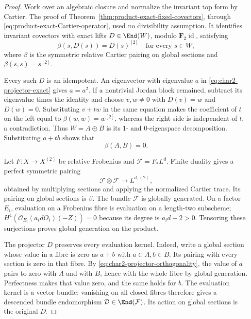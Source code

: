 \begin{proof}
Work over an algebraic closure and normalize the invariant top
form by Cartier.  The proof of
Theorem~\ref{thm:product-exact-fixed-covectors}, through
\eqref{eq:product-exact-Cartier-operator}, used no divisibility
assumption.  It identifies invariant covectors with exact lifts
$D\in\End(W)$, modulo $\mathbf F_2\operatorname{id}$, satisfying
\begin{equation}\label{eq:char2-projector-exact}
        \beta(s,D(s))=D(s)^{[2]}\quad\text{for every }s\in W,
\end{equation}
where $\beta$ is the symmetric relative Cartier pairing on
global sections and $\beta(s,s)=s^{[2]}$.

Every such $D$ is an idempotent.  An eigenvector with eigenvalue
$a$ in \eqref{eq:char2-projector-exact} gives $a=a^2$.
If a nontrivial Jordan block remained, subtract its eigenvalue
times the identity and choose $v,w\ne0$ with $D(v)=w$ and
$D(w)=0$.  Substituting $v+tw$ in the same equation makes the
coefficient of $t$ on the left equal to $\beta(w,w)=w^{[2]}$,
whereas the right side is independent of $t$, a contradiction.
Thus $W=A\oplus B$ is its $1$- and $0$-eigenspace decomposition.
Substituting $a+tb$ shows that
\begin{equation}\label{eq:char2-projector-orthogonality}
                    \beta(A,B)=0.
\end{equation}

Let $F:X\to X^{(2)}$ be relative Frobenius and
$\mathcal F=F_*L^d$.  Finite duality gives a perfect symmetric
pairing
\[
 \mathcal F\otimes\mathcal F\longrightarrow L^{d,(2)},
\]
obtained by multiplying sections and applying the normalized
Cartier trace.  Its pairing on global sections is $\beta$.
The bundle $\mathcal F$ is globally generated.  On a factor
$E_i$, evaluation on a Frobenius fibre is evaluation on a
length-two subscheme; $H^1(\mathcal O_{E_i}(a_idO_i)(-Z))=0$
because its degree is $a_i d-2>0$.  Tensoring these surjections
proves global generation on the product.

The projector $D$ preserves every evaluation kernel.
Indeed, write a global section whose value in a fibre is zero
as $a+b$ with $a\in A,b\in B$.  Its pairing with every section
is zero in that fibre.  By
\eqref{eq:char2-projector-orthogonality}, the value of $a$ pairs
to zero with $A$ and with $B$, hence with the whole fibre by
global generation.  Perfectness makes that value zero, and the
same holds for $b$.  The evaluation kernel is a vector bundle;
vanishing on all closed fibres therefore gives a descended
bundle endomorphism $\mathcal D\in\End(\mathcal F)$.
Its action on global sections is the original $D$.


\end{proof}
